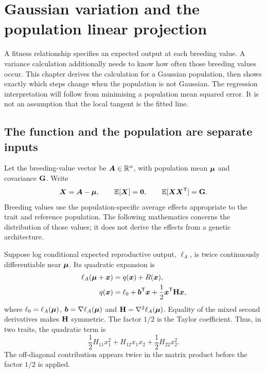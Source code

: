 \chapter{Gaussian variation and the population linear projection}
\label{gaussian:chapter}

A fitness relationship specifies an expected output at each breeding value.
A variance calculation additionally needs to know how often those breeding
values occur. This chapter derives the calculation for a Gaussian population,
then shows exactly which steps change when the population is not Gaussian.
The regression interpretation will follow from minimising a population mean
squared error. It is not an assumption that the local tangent is the fitted
line.

\section{The function and the population are separate inputs}
\label{gaussian:quadratic_target}

Let the breeding-value vector be $\boldsymbol{A}\in\mathbb R^n$, with population mean
$\boldsymbol{\mu}$ and covariance $\mathbf{G}$. Write
\begin{equation}
\boldsymbol{X}=\boldsymbol{A}-\boldsymbol{\mu},
\qquad \mathbb E[\boldsymbol{X}]=\boldsymbol{0},
\qquad \mathbb E[\boldsymbol{X}\boldsymbol{X}^{\mathsf T}]=\mathbf{G}.
\end{equation}
Breeding values use the population-specific average effects appropriate to
the trait and reference population. The following mathematics concerns the
distribution of those values; it does not derive the effects from a genetic
architecture.

Suppose log conditional expected reproductive output, $\ell_A$, is twice
continuously differentiable near $\boldsymbol{\mu}$. Its quadratic expansion is
\begin{align}
\ell_A(\boldsymbol{\mu}+\boldsymbol{x})
 &=q(\boldsymbol{x})+R(\boldsymbol{x}),\nonumber\\
q(\boldsymbol{x})
 &=\ell_0+\boldsymbol{b}^{\mathsf T}\boldsymbol{x}
       +\frac12\boldsymbol{x}^{\mathsf T}\mathbf{H}\boldsymbol{x},
\label{gaussian:quadratic_definition}
\end{align}
where $\ell_0=\ell_A(\boldsymbol{\mu})$, $\boldsymbol{b}=\nabla\ell_A(\boldsymbol{\mu})$ and
$\mathbf{H}=\nabla^2\ell_A(\boldsymbol{\mu})$. Equality of the mixed second derivatives
makes $\mathbf{H}$ symmetric. The factor $1/2$ is the Taylor coefficient. Thus,
in two traits, the quadratic term is
\[
\frac12H_{11}x_1^2+H_{12}x_1x_2+\frac12H_{22}x_2^2.
\]
The off-diagonal contribution appears twice in the matrix product before
the factor $1/2$ is applied.

